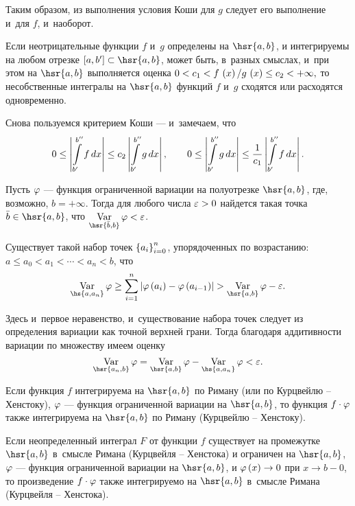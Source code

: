 \documentclass[draft]{article}
\begin{document}
Таким образом, из выполнения условия Коши для $g$ следует его
выполнение и~для $f$, и~наоборот.

\prtm

\bigskip


Если неотрицательные функции $f$ и~$g$ определены на $\hsr{a, b}$,
и интегрируемы на любом отрезке $\seg[a,b']\subset\hsr{a, b}$,
может быть, в~разных смыслах, и~при этом на $\hsr{a, b}$
выполняется оценка $0<c_1<{f\,\atx/g\,\atx}\le c_2<+\infty,$ то
несобственные интегралы на $\hsr{a, b}$ функций $f$ и~$g$ сходятся
или расходятся одновременно.

\pr

Снова пользуемся критерием Коши --- и~замечаем, что
$$0\le\abs{\intd[b',b'']f,x}\le c_2\abs{\intd[b',b'']g,x},\qquad
0\le\abs{\intd[b',b'']g,x}\le{1\over c_1}\abs{\intd[b',b'']f,x}.$$

\prtm

\bigskip

\lm

Пусть $\varphi$ --- функция ограниченной вариации на полуотрезке
$\hsr{a, b}$, где, возможно, $b=+\infty$. Тогда для любого числа
$\varepsilon > 0$ найдется такая точка $\bar{b}\in\hsr{a, b}$, что
$\var_{\hsr{\bar{b},b}}\ph<\ep$.

\pr

Существует такой набор точек $\left\{a_i\right\}_{i=0}^n$, упорядоченных по
возрастанию: $a\le a_0<a_1<\cdots<a_n<b$, что
$$\var_{\hs{a,a_n}}\ph\ge\sum_{i=1}^n\abs{\ph\at(a_i)-\ph\at(a_{i-1})}>\var_{\hsr{a,b}}\ph-\ep.$$

Здесь и~первое неравенство, и~существование набора точек следует из
определения вариации как точной верхней грани. Тогда благодаря
аддитивности вариации по множеству имеем оценку
$$\var_{\hsr{a_n,b}}\ph=\var_{\hsr{a,b}}\ph-\var_{\hs{a,a_n}}\ph<\ep.$$

\prlm

\bigskip


Если функция $f$ интегрируема на $\hsr{a, b}$ по Риману (или по
Курцвейлю -- Хенстоку), $\varphi$ --- функция ограниченной вариации на
$\hsr{a, b}$, то функция $f\cdot\varphi$ также интегрируема на
$\hsr{a, b}$ по Риману (Курцвейлю -- Хенстоку).

\smallskip


Если неопределенный интеграл $F$ от функции $f$ существует на
промежутке $\hsr{a, b}$ в~смысле Римана (Курцвейля -- Хенстока) и
ограничен на $\hsr{a, b}$, $\varphi$
--- функция ограниченной вариации на $\hsr{a, b}$, и
$\ph\atx\rightarrow0$ при $x\rightarrow b-0$, то произведение
$f\cdot\varphi$ также интегрируемо на $\hsr{a, b}$ в~смысле Римана
(Курцвейля -- Хенстока).
\end{document}
